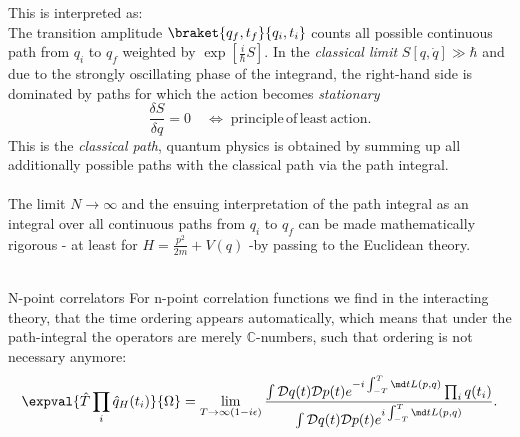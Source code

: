 This is interpreted as:\\
The transition amplitude $\braket{q_f,t_f}{q_i,t_i}$ counts all possible continuous path from $q_i$ to $q_f$ weighted by $\exp\left[\frac{i}{\hbar} S\right]$. In the \emph{classical limit} $S[q,\dot{q}] \gg \hbar$ and due to the strongly oscillating phase of the integrand, the right-hand side is dominated by paths for which the action becomes \emph{stationary}
\begin{equation}
	\frac{\delta S}{\delta q} =0 \quad \Leftrightarrow \; \mathrm{principle\,of\,least\, action}.
\end{equation}
This is the \emph{classical path}, quantum physics is obtained by summing up all additionally possible paths with the classical path via the path integral.\\
\\
The limit $N\rightarrow\infty$ and the ensuing interpretation of the path integral as an integral over all continuous paths from $q_i$ to $q_f$ can be made mathematically rigorous - at least for $H=\frac{p^2}{2m} +V(q)$ -by passing to the Euclidean theory.\\
\\
\begin{mybox}{N-point correlators}
	For n-point correlation functions we find in the interacting theory, that the time ordering appears automatically, which means that under the path-integral the operators are merely $\mathbb{C}$-numbers, such that ordering is not necessary anymore:
	\begin{equation}
		\expval{\hat{T}\prod_i \hat{q}_H(t_i) }{\Omega} = \lim_{T\rightarrow \infty(1-i \epsilon)} \frac{\int \mathcal{D}q(t) \mathcal{D}p(t) e^{-i \int_{-T}^{T} \md t L(p,q)} \prod_i q(t_i ) }{\int \mathcal{D}q(t) \mathcal{D}p(t) e^{i \int_{-T}^T \md t L(p,q)} }.
	\end{equation}
\end{mybox}

